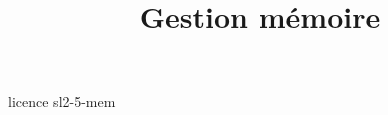 \documentclass {beamer}
\title {Gestion mémoire}
\begin{document}
 {licence}
 {sl2-5-mem}
\end{document}
